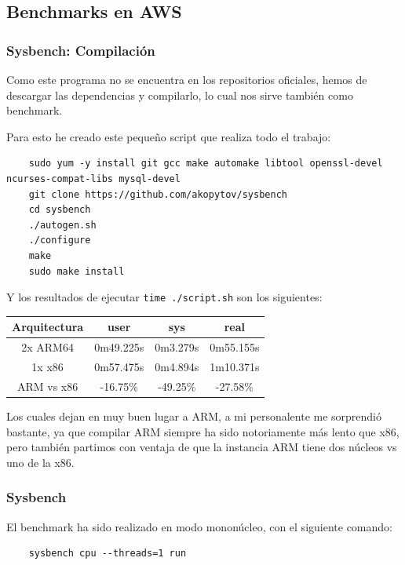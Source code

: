 \documentclass[a4paper,openright,12pt]{article}
\begin{document}
\subsection{Benchmarks en AWS}\label{subsection:benchmarks_aws}
\subsubsection{Sysbench: Compilación}
Como este programa no se encuentra en los repositorios oficiales, hemos de descargar las dependencias y compilarlo, lo cual nos sirve también como benchmark.

Para esto he creado este pequeño script que realiza todo el trabajo:
\begin{verbatim}
    sudo yum -y install git gcc make automake libtool openssl-devel ncurses-compat-libs mysql-devel
    git clone https://github.com/akopytov/sysbench
    cd sysbench
    ./autogen.sh
    ./configure
    make
    sudo make install
\end{verbatim}

Y los resultados de ejecutar \texttt{time ./script.sh} son los siguientes:
\begin{center}
\begin{tabular}{ | c | c | c | c | }
    \hline
    Arquitectura           &   user        &   sys         &   real        \\
    \hline
    2x ARM64               &   0m49.225s   &   0m3.279s    &   0m55.155s   \\
    \hline
    1x x86                 &   0m57.475s   &   0m4.894s    &   1m10.371s   \\
    \hline
    \hline
    ARM vs x86             &   -16.75\%    &   -49.25\%    &   -27.58\%    \\
    \hline
\end{tabular}
\end{center}

Los cuales dejan en muy buen lugar a ARM, a mi personalente me sorprendió bastante, ya que compilar ARM siempre ha sido notoriamente más lento que x86, pero también partimos con ventaja
de que la instancia ARM tiene dos núcleos vs uno de la x86.

\subsubsection{Sysbench}
El benchmark ha sido realizado en modo mononúcleo, con el siguiente comando:
\begin{verbatim}
    sysbench cpu --threads=1 run
\end{verbatim}
\end{document}
